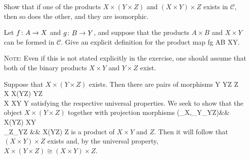 \bx
\ben[label=(\alph*)]
\item Show that if one of the products $X\times(Y\times Z)$ and $(X\times Y)\times Z$ exists in $\mathcal{C}$, then so does the other, and they are isomorphic.
\item Let $f\colon A\to X$ and $g\colon B\to Y$, and suppose that the products $A\times B$ and $X\times Y$ can be formed in $\mathcal{C}$. Give an explicit definition for the product map
\bse
f\times g \cl A\times B \to X\times Y.
\ese
\een
\ex

\bs
{\scshape Note}: Even if this is not stated explicitly in the exercise, one should assume that both of the binary products $X\times Y$ and $Y\times Z$ exist. 
\ben[label=(\alph*)]
\item Suppose that $X\times(Y\times Z)$ exists. Then there are pairs of morphisms
Y  Y\times Z  Z\\
X  X\times (Y\times Z)  Y\times Z\\
X  X\times Y  Y
\ei
satisfying the respective universal properties. We seek to show that the object $X\times(Y\times Z)$ together with projection morphisms
(\pr_X,\pr_Y\circ\pr_{Y\times Z})\cl && X\times(Y\times Z) \longrightarrow X\times Y\\ 
\pr_Z\circ\pr_{Y\times Z} \cl &&  X\times(Y\times Z) \longrightarrow Z
\ei
is a product of $X\times Y$ and $Z$. Then it will follow that $(X\times Y)\times Z$ exists and, by the universal property, $X\times (Y\times Z)\cong (X\times Y)\times Z$.

